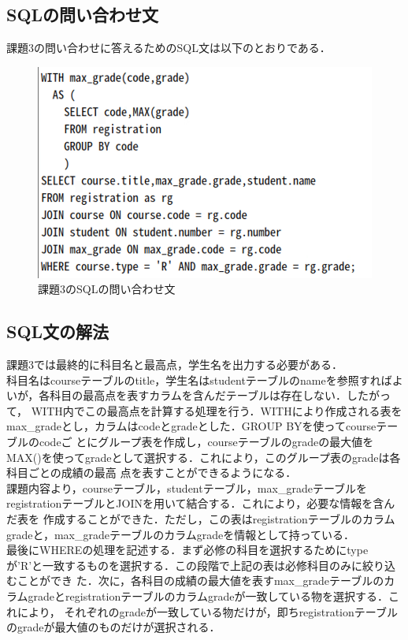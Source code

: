 \documentclass[dvipdfmx]{jarticle}
\begin{document}
\subsection{SQLの問い合わせ文}
課題3の問い合わせに答えるためのSQL文は以下のとおりである．\\
\begin{figure}[h]
    \centering
    \includegraphics[width=12cm]{sql3.png}
    \caption{課題3のSQLの問い合わせ文}
\end{figure} 
\subsection{SQL文の解法}
課題3では最終的に科目名と最高点，学生名を出力する必要がある．\\
科目名はcourseテーブルのtitle，学生名はstudentテーブルのnameを参照すればよいが，各科目の最高点を表すカラムを含んだテーブルは存在しない．したがって，
WITH内でこの最高点を計算する処理を行う．WITHにより作成される表をmax\_gradeとし，カラムはcodeとgradeとした．GROUP BYを使ってcourseテーブルのcodeご
とにグループ表を作成し，courseテーブルのgradeの最大値をMAX()を使ってgradeとして選択する．これにより，このグループ表のgradeは各科目ごとの成績の最高
点を表すことができるようになる．\\
課題内容より，courseテーブル，studentテーブル，max\_gradeテーブルをregistrationテーブルとJOINを用いて結合する．これにより，必要な情報を含んだ表を
作成することができた．ただし，この表はregistrationテーブルのカラムgradeと，max\_gradeテーブルのカラムgradeを情報として持っている．\\
最後にWHEREの処理を記述する．まず必修の科目を選択するためにtypeが'R'と一致するものを選択する．この段階で上記の表は必修科目のみに絞り込むことができ
た．次に，各科目の成績の最大値を表すmax\_gradeテーブルのカラムgradeとregistrationテーブルのカラムgradeが一致している物を選択する．これにより，
それぞれのgradeが一致している物だけが，即ちregistrationテーブルのgradeが最大値のものだけが選択される．
\end{document}
